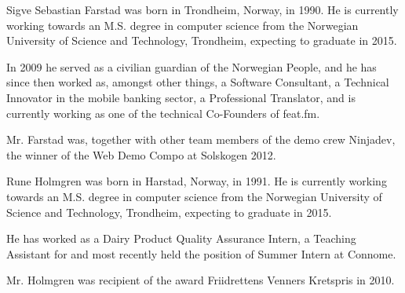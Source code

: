 \documentclass[a4paper]{IEEEtran}
\begin{document}
\begin{IEEEbiography}{Sigve Sebastian Farstad}
    was born in Trondheim, Norway, in 1990.
    He is currently working towards an M.S. degree in computer science from the Norwegian University of Science and Technology, Trondheim, expecting to graduate in 2015.

    In 2009 he served as a civilian guardian of the Norwegian People, and he has since then worked as, amongst other things, a Software Consultant, a Technical Innovator in the mobile banking sector, a Professional Translator, and is currently working as one of the technical Co-Founders of feat.fm.

    Mr. Farstad was, together with other team members of the demo crew Ninjadev, the winner of the Web Demo Compo at Solskogen 2012.
\end{IEEEbiography}

\begin{IEEEbiography}{Rune Holmgren}
    was born in Harstad, Norway, in 1991.
    He is currently working towards an M.S. degree in computer science from the Norwegian University of Science and Technology, Trondheim, expecting to graduate in 2015.

    He has worked as a Dairy Product Quality Assurance Intern, a Teaching Assistant for and most recently held the position of Summer Intern at Connome.

    Mr. Holmgren was recipient of the award Friidrettens Venners Kretspris in 2010.
\end{IEEEbiography}
\end{document}
